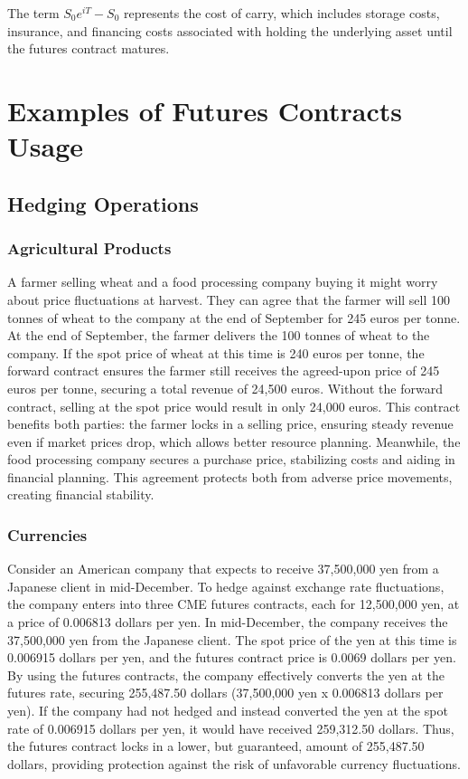 \documentclass[a4paper,10pt]{article}
\begin{document}
        \noindent   The term \( S_0 e^{iT} - S_0 \) represents the cost of carry, which includes storage costs, insurance, and financing costs associated with holding the underlying asset until the futures contract matures. \\

        
        
\section*{Examples of Futures Contracts Usage}
    \subsection*{Hedging Operations}
        \subsubsection*{Agricultural Products}
        
            \noindent A farmer selling wheat and a food processing company buying it might worry about price fluctuations at harvest. They can agree that the farmer will sell 100 tonnes of wheat to the company at the end of September for 245 euros per tonne. At the end of September, the farmer delivers the 100 tonnes of wheat to the company. If the spot price of wheat at this time is 240 euros per tonne, the forward contract ensures the farmer still receives the agreed-upon price of 245 euros per tonne, securing a total revenue of 24,500 euros. Without the forward contract, selling at the spot price would result in only 24,000 euros. This contract benefits both parties: the farmer locks in a selling price, ensuring steady revenue even if market prices drop, which allows better resource planning. Meanwhile, the food processing company secures a purchase price, stabilizing costs and aiding in financial planning. This agreement protects both from adverse price movements, creating financial stability.
    
        \subsubsection*{Currencies}
        
            \noindent Consider an American company that expects to receive 37,500,000 yen from a Japanese client in mid-December. To hedge against exchange rate fluctuations, the company enters into three CME futures contracts, each for 12,500,000 yen, at a price of 0.006813 dollars per yen. In mid-December, the company receives the 37,500,000 yen from the Japanese client. The spot price of the yen at this time is 0.006915 dollars per yen, and the futures contract price is 0.0069 dollars per yen. By using the futures contracts, the company effectively converts the yen at the futures rate, securing 255,487.50 dollars (37,500,000 yen x 0.006813 dollars per yen). If the company had not hedged and instead converted the yen at the spot rate of 0.006915 dollars per yen, it would have received 259,312.50 dollars. Thus, the futures contract locks in a lower, but guaranteed, amount of 255,487.50 dollars, providing protection against the risk of unfavorable currency fluctuations. 
\end{document}
